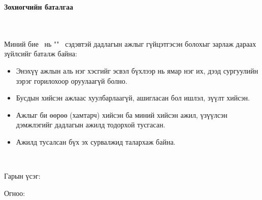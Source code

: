 \makefrontpage
\maketitle

\doublespace

\begin{huge}
\textbf{Зохиогчийн баталгаа}
\end{huge} \\ \ \\ 
\doublespace
Миний бие \@author \ нь "\@title" \ сэдэвтэй дадлагын ажлыг гүйцэтгэсэн болохыг зарлаж дараах зүйлсийг баталж байна:
\begin{itemize}
\item Энэхүү ажлын аль нэг хэсгийг эсвэл бүхлээр нь ямар нэг их, дээд сургуулийн зэрэг горилохоор оруулаагүй болно.
\item Бусдын хийсэн ажлаас хуулбарлаагүй, ашигласан бол ишлэл, зүүлт хийсэн.
\item Ажлыг би өөрөө (хамтарч) хийсэн ба миний хийсэн ажил, үзүүлсэн дэмжлэгийг дадлагын ажилд тодорхой тусгасан. 
\item Ажилд тусалсан бүх эх сурвалжид талархаж байна.  
\end{itemize} 
\ 

Гарын үсэг: \underline{\hspace{5cm}}

Огноо: 	\ \ \underline{\hspace{3cm}}

